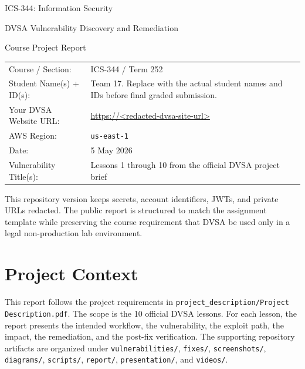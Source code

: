 \documentclass[12pt]{article}
\begin{document}
\begin{titlepage}
\centering
{\Large ICS-344: Information Security\par}
\vspace{0.4cm}
{\LARGE DVSA Vulnerability Discovery and Remediation\par}
\vspace{0.6cm}
{\large Course Project Report\par}
\vfill
\begin{tabular}{p{}p{}}
Course / Section: & ICS-344 / Term 252 \\
Student Name(s) + ID(s): & Team 17. Replace with the actual student names and IDs before final graded submission. \\
Your DVSA Website URL: & \url{https://<redacted-dvsa-site-url>} \\
AWS Region: & \texttt{us-east-1} \\
Date: & 5 May 2026 \\
Vulnerability Title(s): & Lessons 1 through 10 from the official DVSA project brief \\
\end{tabular}
\vfill
\begin{minipage}{0.92\textwidth}
\small
This repository version keeps secrets, account identifiers, JWTs, and private URLs redacted. The public report is structured to match the assignment template while preserving the course requirement that DVSA be used only in a legal non-production lab environment.
\end{minipage}
\end{titlepage}

\tableofcontents
\clearpage

\section*{Project Context}

This report follows the project requirements in \texttt{project\_description/Project Description.pdf}. The scope is the 10 official DVSA lessons. For each lesson, the report presents the intended workflow, the vulnerability, the exploit path, the impact, the remediation, and the post-fix verification. The supporting repository artifacts are organized under \texttt{vulnerabilities/}, \texttt{fixes/}, \texttt{screenshots/}, \texttt{diagrams/}, \texttt{scripts/}, \texttt{report/}, \texttt{presentation/}, and \texttt{videos/}.
\end{document}
